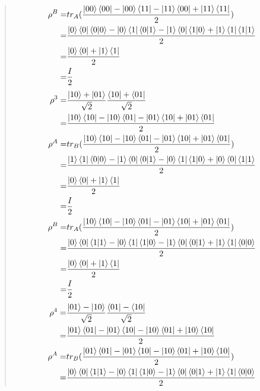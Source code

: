 \documentclass[UTF8]{ctexart}
\begin{document}
\begin{quote}
\begin{equation}
\begin{aligned}
					\rho^{B}=&tr_{A}(\frac{\ket{00}\bra{00}-\ket{00}\bra{11}-\ket{11}\bra{00}+\ket{11}\bra{11}}{2}) \\
					=&\frac{\ket{0}\bra{0}\bra{0}\ket{0}-\ket{0}\bra{1}\bra{0}\ket{1}-\ket{1}\bra{0}\bra{1}\ket{0}+\ket{1}\bra{1}\bra{1}\ket{1}}{2}\\
					=&\frac{\ket{0}\bra{0}+\ket{1}\bra{1}}{2}\\
					=&\frac{I}{2} \\
				\end{aligned}
			\end{equation}
			\begin{equation}
				\begin{aligned}
			\rho^{3}=&\frac{\ket{10}+\ket{01}}{\sqrt{2}}\frac{\bra{10}+\bra{01}}{\sqrt{2}}\\
					=&\frac{\ket{10}\bra{10}-\ket{10}\bra{01}-\ket{01}\bra{10}+\ket{01}\bra{01}}{2} \\
			\rho^{A}=&tr_{B}(\frac{\ket{10}\bra{10}-\ket{10}\bra{01}-\ket{01}\bra{10}+\ket{01}\bra{01}}{2}) \\
					=&\frac{\ket{1}\bra{1}\bra{0}\ket{0}-\ket{1}\bra{0}\bra{0}\ket{1}-\ket{0}\bra{1}\bra{1}\ket{0}+\ket{0}\bra{0}\bra{1}\ket{1}}{2}\\
					=&\frac{\ket{0}\bra{0}+\ket{1}\bra{1}}{2}\\
					=&\frac{I}{2} \\
					\rho^{B}=&tr_{A}(\frac{\ket{10}\bra{10}-\ket{10}\bra{01}-\ket{01}\bra{10}+\ket{01}\bra{01}}{2}) \\
					=&\frac{\ket{0}\bra{0}\bra{1}\ket{1}-\ket{0}\bra{1}\bra{1}\ket{0}-\ket{1}\bra{0}\bra{0}\ket{1}+\ket{1}\bra{1}\bra{0}\ket{0}}{2}\\
					=&\frac{\ket{0}\bra{0}+\ket{1}\bra{1}}{2}\\
					=&\frac{I}{2} \\
				\end{aligned}
			\end{equation}
			\begin{equation}
				\begin{aligned}
			\rho^{4}=&\frac{\ket{01}-\ket{10}}{\sqrt{2}}\frac{\bra{01}-\bra{10}}{\sqrt{2}}\\
					=&\frac{\ket{01}\bra{01}-\ket{01}\bra{10}-\ket{10}\bra{01}+\ket{10}\bra{10}}{2} \\
			\rho^{A}=&tr_{B}(\frac{\ket{01}\bra{01}-\ket{01}\bra{10}-\ket{10}\bra{01}+\ket{10}\bra{10}}{2}) \\
					=&\frac{\ket{0}\bra{0}\bra{1}\ket{1}-\ket{0}\bra{1}\bra{1}\ket{0}-\ket{1}\bra{0}\bra{0}\ket{1}+\ket{1}\bra{1}\bra{0}\ket{0}}{2}\\

\end{aligned}
\end{equation}
\end{quote}
\end{document}
